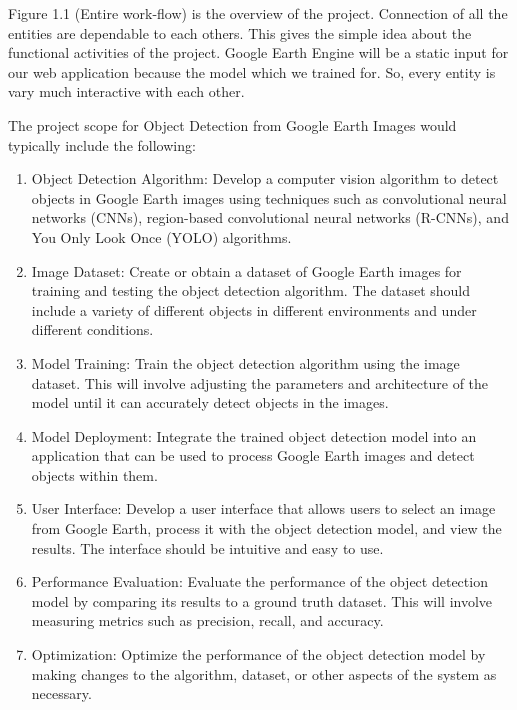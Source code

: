 	Figure 1.1 (Entire work-flow) is the overview of the project. Connection of all the entities are dependable to each others.  This gives the simple idea about the functional activities of the project. 
	\newline
	Google Earth Engine will be a static input for our web application because the model which we trained for.
	\newline
	So, every entity is vary much interactive with each other.
	
	The project scope for Object Detection from Google Earth Images would typically include the following:
	
	\begin{enumerate}
		\item Object Detection Algorithm: Develop a computer vision algorithm to detect objects in Google Earth images using techniques such as convolutional neural networks (CNNs), region-based convolutional neural networks (R-CNNs), and You Only Look Once (YOLO) algorithms.
		\item Image Dataset: Create or obtain a dataset of Google Earth images for training and testing the object detection algorithm. The dataset should include a variety of different objects in different environments and under different conditions.
		\item Model Training: Train the object detection algorithm using the image dataset. This will involve adjusting the parameters and architecture of the model until it can accurately detect objects in the images.
		\item Model Deployment: Integrate the trained object detection model into an application that can be used to process Google Earth images and detect objects within them.
		\item User Interface: Develop a user interface that allows users to select an image from Google Earth, process it with the object detection model, and view the results. The interface should be intuitive and easy to use.
		\item Performance Evaluation: Evaluate the performance of the object detection model by comparing its results to a ground truth dataset. This will involve measuring metrics such as precision, recall, and accuracy.
		\item Optimization: Optimize the performance of the object detection model by making changes to the algorithm, dataset, or other aspects of the system as necessary.
	\end{enumerate}
	
